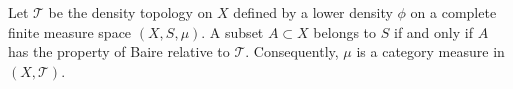 Let $\mathcal{T}$ be the density topology on $X$ defined by a lower density $\phi$ on a complete finite measure space $(X, S, \mu)$. A subset $A \subset X$ belongs to $S$ if and only if $A$ has the property of Baire relative to $\mathcal{T}$. Consequently, $\mu$ is a category measure in $(X, \mathcal{T})$.
